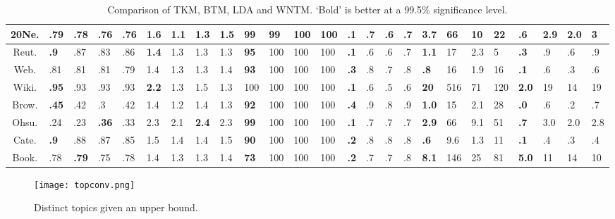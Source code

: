 \documentclass[twocolumn,10]{article}
\begin{document}
\begin{table*}[htp]
\begin{small}
\begin{tabular} {| c | l | l | l | l || l | l| l| l || l|l| l| l ||  l|l| l| l || l|l| l| l ||l|l| l| l|}
			20Ne. &\textbf{.79} &.78 &.76&.76 &\textbf{1.6} &1.1 &1.3&1.5 &\textbf{99} &99 &100&100 &\textbf{.1} &.7 &.6&.7 &\textbf{3.7} &66 &10 &22 &\textbf{.6} &2.9 &2.0 & 3 \\ \hline 
			Reut. &\textbf{.9} &.87 &.83 &.86 &\textbf{1.4} &1.3 &1.3 &1.3&\textbf{95} &100 &100 &100 &\textbf{.1} &.6 &.6 &.7&\textbf{1.1} &17 &2.3 &5 &\textbf{.3} &.9 &.6&.9 \\ \hline 
			Web. &.81 &.81 &.81&.79 &1.4 &1.3 &1.3&1.4 &\textbf{93} &100&100 &100 &\textbf{.3} &.8 &.7 &.8 &\textbf{.8} &16 &1.9&16 &\textbf{.1} &.6 &.3&.6 \\ \hline 
			Wiki. &\textbf{.95} &.93 &.93&.93 &\textbf{2.2} &1.3 &1.5&1.3 &100 &100 &100 &100 &\textbf{.1} &.6 &.5 &.6 &\textbf{20} &516 &71&120 &\textbf{2.0} &19 &14 &19 \\ \hline 
			Brow. &\textbf{.45} &.42 &.3&.42 &1.4 &1.2 &1.4 &1.3&\textbf{92} &100 &100 &100 &\textbf{.4} &.9 &.8 &.9 &\textbf{1.0} &15 &2.1 &28 &\textbf{.0} &.6 &.2 &.7 \\ \hline  
			Ohsu. &.24 &.23 &\textbf{.36}&.33 &2.3 &2.1 &\textbf{2.4} &2.3 &\textbf{99} &100 &100&100 &\textbf{.1} &.7 &.7 &.7 &\textbf{2.9} &66 &9.1&51 &\textbf{.7} &3.0 &2.0&2.8 \\ \hline 
			Cate. &\textbf{.9} &.88 &.87&.85 &1.5 &1.4 &1.4&1.5 &\textbf{90} &100 &100&100 &\textbf{.2} &.8 &.8 &.8&\textbf{.6} &9.6 &1.3&11 &\textbf{.1} &.4 &.3&.4 \\ \hline 
			Book. &.78 &\textbf{.79} &.75&.78 &1.4 &1.3 &1.3&1.4 &\textbf{73} &100 &100 &100 &\textbf{.2} &.7 &.7 &.8&\textbf{8.1} &146 &25 &81&\textbf{5.0} &11 &14&10 \\ \hline 
		\end{tabular}	
		\caption{Comparison of TKM, BTM, LDA and WNTM. `Bold' is better at a 99.5\% significance level.}\label{tab:res}
	\end{small}
	\vspace{-15pt}
\end{table*}

	\begin{figure}[htp]
		\vspace{-10pt}
		\texttt{[image: topconv.png]}
		\vspace{-18pt}
		\caption{Distinct topics given an upper bound.}%
		\label{fig:top}
		\vspace{-7pt}
	\end{figure}
		\vspace{-7pt}
\end{document}

